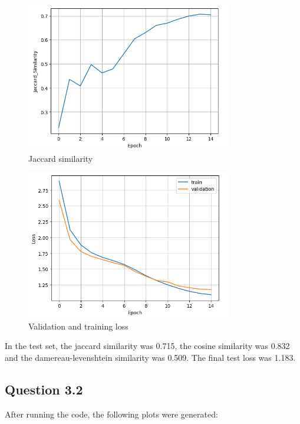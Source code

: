 \documentclass{article}
\begin{document}
\begin{figure}[H]
    \centering
    \includegraphics[width=0.8\textwidth]{../report/plots/RNN-jaccard-similarity.png}
    \caption{Jaccard similarity}
    \label{fig:rnn-jaccard-similarity}
\end{figure}

\begin{figure}[H]
    \centering
    \includegraphics[width=0.8\textwidth]{../report/plots/RNN-valid-train-loss.png}
    \caption{Validation and training loss}
    \label{fig:rnn-valid-train-loss}
\end{figure}


In the test set, the jaccard similarity was 0.715, the cosine similarity was 0.832 and the damereau-levenshtein similarity was 0.509. The final test loss was 1.183.
\subsection{Question 3.2}
After running the code, the following plots were generated:
\end{document}
